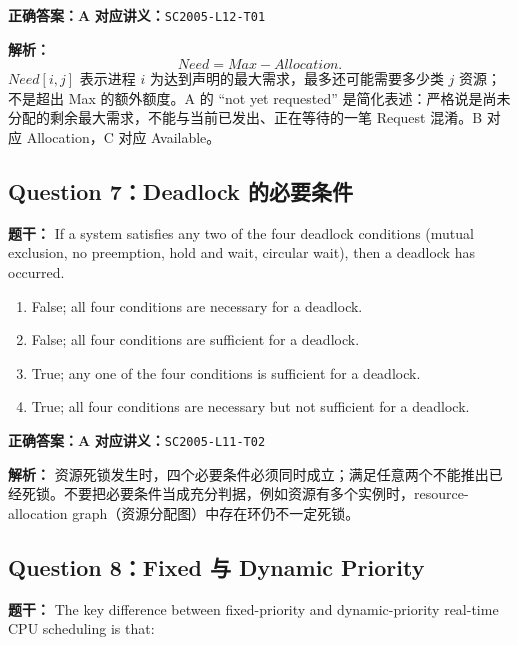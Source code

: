 \documentclass[11pt,a4paper,fontset=fandol]{ctexart}
\renewcommand{\exercisequestion}[2]{%
  \Needspace{5\baselineskip}%
  \subsection{#2}\label{exercise:#1}%
}
\renewenvironment{checkedsolution}
  {\par\nopagebreak[4]\textbf{解析：}\ignorespaces}
  {\par}
\begin{document}
\textbf{正确答案：A}\qquad
\textbf{对应讲义：}\texttt{SC2005-L12-T01}

\begin{checkedsolution}
\[
  \boxed{Need=Max-Allocation}.
\]
$Need[i,j]$ 表示进程 $i$ 为达到声明的最大需求，最多还可能需要多少类 $j$ 资源；不是超出 Max 的额外额度。A 的 ``not yet requested'' 是简化表述：严格说是尚未分配的剩余最大需求，不能与当前已发出、正在等待的一笔 Request 混淆。B 对应 Allocation，C 对应 Available。
\end{checkedsolution}

\exercisequestion{SC2005-HW04-Q07}{Question 7：Deadlock 的必要条件}

\textbf{题干：} If a system satisfies any two of the four deadlock conditions (mutual exclusion, no preemption, hold and wait, circular wait), then a deadlock has occurred.

\begin{enumerate}[label=\Alph*.,leftmargin=2.4em]
  \item False; all four conditions are necessary for a deadlock.
  \item False; all four conditions are sufficient for a deadlock.
  \item True; any one of the four conditions is sufficient for a deadlock.
  \item True; all four conditions are necessary but not sufficient for a deadlock.
\end{enumerate}

\textbf{正确答案：A}\qquad
\textbf{对应讲义：}\texttt{SC2005-L11-T02}

\begin{checkedsolution}
资源死锁发生时，四个必要条件必须同时成立；满足任意两个不能推出已经死锁。不要把必要条件当成充分判据，例如资源有多个实例时，resource-allocation graph（资源分配图）中存在环仍不一定死锁。
\end{checkedsolution}

\exercisequestion{SC2005-HW04-Q08}{Question 8：Fixed 与 Dynamic Priority}

\textbf{题干：} The key difference between fixed-priority and dynamic-priority real-time CPU scheduling is that:
\end{document}
